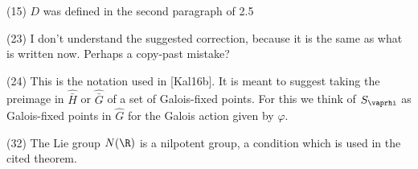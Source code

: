 (15) $D$ was defined in the second paragraph of 2.5

(23) I don't understand the suggested correction, because it is the same as what is written now. Perhaps a copy-past mistake?

(24) This is the notation used in [Kal16b]. It is meant to suggest taking the preimage in $\hat{\bar H}$ or $\hat{\bar G}$ of a set of Galois-fixed points. For this we think of $S_\vaprhi$ as Galois-fixed points in $\hat G$ for the Galois action given by $\varphi$.

(32) The Lie group $N(\R)$ is a nilpotent group, a condition which is used in the cited theorem.

